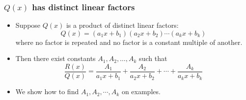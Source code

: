 \begin{frame}
\frametitle{$Q(x)$ has distinct linear factors}
\begin{itemize}
\item Suppose $Q(x)$ is a product of distinct linear factors:
\[
Q(x) = (a_1x+b_1)(a_2x+b_2) \cdots (a_kx+b_k)
\]
where no factor is repeated and no factor is a constant multiple of another.
\item<2-> Then there exist constants $A_1, A_2, \ldots , A_k$ such that
\[
\frac{R(x)}{Q(x)} = \frac{A_1}{a_1x+b_1} + \frac{A_2}{a_2x+b_2} + \cdots + \frac{A_k}{a_kx+b_k}
\]
\item<3-> We show how to find $A_1, A_2, \cdots , A_k$ on examples.
\end{itemize}
\end{frame}
